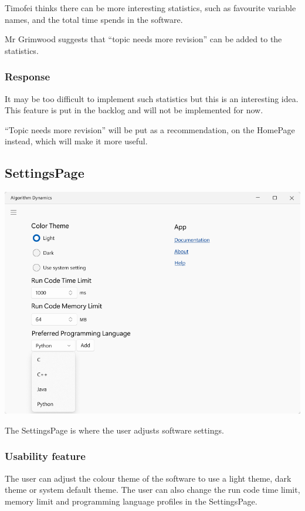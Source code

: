 \documentclass[a4paper]{report}
\begin{document}
Timofei thinks there can be more interesting statistics, such as favourite variable names, and the total time spends in the software.

Mr Grimwood suggests that ``topic needs more revision'' can be added to the statistics.

\subsubsection{Response}
It may be too difficult to implement such statistics but this is an interesting idea. This feature is put in the backlog and will not be implemented for now.

``Topic needs more revision'' will be put as a recommendation, on the HomePage instead, which will make it more useful.

\subsection{SettingsPage}
\label{sec:SettingsPageDesign}

\includegraphics[width=\textwidth, height=\textheight, keepaspectratio]{SettingsPage-design}

The SettingsPage is where the user adjusts software settings.

\subsubsection{Usability feature}

The user can adjust the colour theme of the software to use a light theme, dark theme or system default theme. The user can also change the run code time limit, memory limit and programming language profiles in the SettingsPage.
\end{document}

